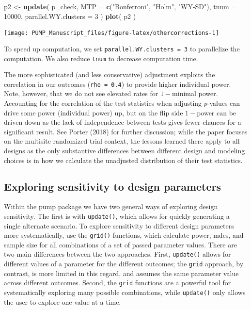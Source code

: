 \documentclass[
]{article}
\newenvironment{Shaded}{\begin{snugshade}}{\end{snugshade}}
\newcommand{\DataTypeTok}[1]{\textcolor[rgb]{0.13,0.29,0.53}{#1}}
\newcommand{\DecValTok}[1]{\textcolor[rgb]{0.00,0.00,0.81}{#1}}
\newcommand{\KeywordTok}[1]{\textcolor[rgb]{0.13,0.29,0.53}{\textbf{#1}}}
\newcommand{\NormalTok}[1]{#1}
\newcommand{\StringTok}[1]{\textcolor[rgb]{0.31,0.60,0.02}{#1}}
\begin{document}
\begin{Shaded}
\begin{Highlighting}[]
\NormalTok{p2 \textless{}{-}}\StringTok{ }\KeywordTok{update}\NormalTok{( p\_check,}
              \DataTypeTok{MTP =} \KeywordTok{c}\NormalTok{(}\StringTok{"Bonferroni"}\NormalTok{, }\StringTok{"Holm"}\NormalTok{, }\StringTok{"WY{-}SD"}\NormalTok{),}
              \DataTypeTok{tnum =} \DecValTok{10000}\NormalTok{,}
              \DataTypeTok{parallel.WY.clusters =} \DecValTok{3}\NormalTok{ )}
\KeywordTok{plot}\NormalTok{( p2 )}
\end{Highlighting}
\end{Shaded}

\begin{center}\texttt{[image: PUMP\_Manuscript\_files/figure-latex/othercorrections-1]} \end{center}

To speed up computation, we set \texttt{parallel.WY.clusters\ =\ 3} to
parallelize the computation. We also reduce \texttt{tnum} to decrease
computation time.

The more sophisticated (and less conservative) adjustment exploits the
correlation in our outcomes (\texttt{rho\ =\ 0.4}) to provide higher
individual power. Note, however, that we do not see elevated rates for
\(1-\)minimal power. Accounting for the correlation of the test
statistics when adjusting \(p\)-values can drive some power (individual
power) up, but on the flip side \(1-\)power can be driven down as the
lack of independence between tests gives fewer chances for a significant
result. See Porter (2018) for further discussion; while the paper
focuses on the multisite randomized trial context, the lessons learned
there apply to all designs as the only substantive differences between
different design and modeling choices is in how we calculate the
unadjusted distribution of their test statistics.

\subsection{Exploring sensitivity to design parameters}

Within the pump package we have two general ways of exploring design
sensitivity. The first is with \texttt{update()}, which allows for
quickly generating a single alternate scenario. To explore sensitivity
to different design parameters more systematically, use the
\texttt{grid()} functions, which calculate power, mdes, and sample size
for all combinations of a set of passed parameter values. There are two
main differences between the two approaches. First, \texttt{update()}
allows for different values of a parameter for the different outcomes;
the \texttt{grid} approach, by contrast, is more limited in this regard,
and assumes the same parameter value across different outcomes. Second,
the \texttt{grid} functions are a powerful tool for systematically
exploring many possible combinations, while \texttt{update()} only
allows the user to explore one value at a time.
\end{document}
